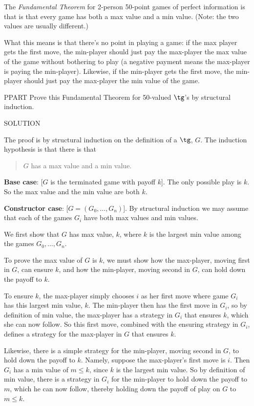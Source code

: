 \begin{definition}
The \emph{Fundamental Theorem} for 2-person 50-point games of perfect
information is that is that every game has both a max value and a min
value.  (Note: the two values are usually different.)

What this means is that there's no point in playing a game: if the max
player gets the first move, the min-player should just pay the max-player
the max value of the game without bothering to play (a negative payment
means the max-player is paying the min-player).  Likewise, if the
min-player gets the first move, the min-player should just pay the
max-player the min value of the game.



PPART\label{finpg} Prove this Fundamental Theorem for 50-valued
$\tg$'s by structural induction.

SOLUTION

The proof is by structural induction on the definition of a
  $\tg$, $G$.  The induction hypothesis is that there is that
\begin{quote}
  $G$ has a max value and a min value.
\end{quote}

\textbf{Base case}: [$G$ is the terminated game with payoff $k$].  The only
possible play is $k$.  So the max value and the min value are both $k$.

\textbf{Constructor case}: [$G = (G_0,\dots, G_n)$].  By structural
induction we may assume that each of the games $G_i$ have both max values
and min values.

We first show that $G$ has max value, $k$, where $k$ is the largest min
value among the games $G_0,\dots,G_n$.

To prove the max value of $G$ is $k$, we must show how the max-player,
moving first in $G$, can ensure $k$, and how the min-player, moving second
in $G$, can hold down the payoff to $k$.

To ensure $k$, the max-player simply chooses $i$ as her first move where
game $G_i$ has this largest min value, $k$.  The min-player then has the
first move in $G_i$, so by definition of min value, the max-player has a
strategy in $G_i$ that ensures $k$, which she can now follow.  So this
first move, combined with the ensuring strategy in $G_i$, defines a
strategy for the max-player in $G$ that ensures $k$.

Likewise, there is a simple strategy for the min-player, moving second in
$G$, to hold down the payoff to $k$.  Namely, suppose the max-player's
first move is $i$.  Then $G_i$ has a min value of $m \leq k$, since $k$ is
the largest min value.  So by definition of min value, there is a strategy
in $G_i$ for the min-player to hold down the payoff to $m$, which he can
now follow, thereby holding down the payoff of play on $G$ to $m \leq k$.


\end{definition}
